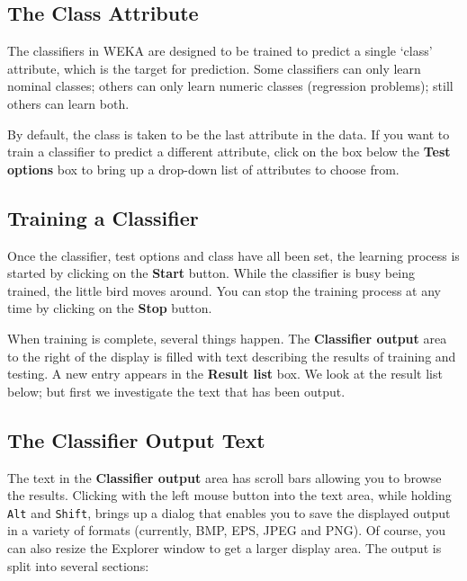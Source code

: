 \subsection{The Class Attribute}

The classifiers in WEKA are designed to be trained to predict a single `class'
attribute, which is the target for prediction. Some classifiers can only learn
nominal classes; others can only learn numeric classes (regression problems);
still others can learn both.

By default, the class is taken to be the last attribute in the data.  If you
want to train a classifier to predict a different attribute, click on the box
below the \textbf{Test options} box to bring up a drop-down list of attributes
to choose from.

\subsection{Training a Classifier}

Once the classifier, test options and class have all been set, the learning
process is started by clicking on the \textbf{Start} button. While the
classifier is busy being trained, the little bird moves around. You can stop
the training process at any time by clicking on the \textbf{Stop} button.

When training is complete, several things happen. The \textbf{Classifier
output} area to the right of the display is filled with text describing the
results of training and testing. A new entry appears in the \textbf{Result
list} box. We look at the result list below; but first we investigate the text
that has been output.

\subsection{The Classifier Output Text}

The text in the \textbf{Classifier output} area has scroll bars allowing you to
browse the results. Clicking with the left mouse button into the text area, 
while holding \texttt{Alt} and \texttt{Shift}, brings up a dialog that enables 
you to save the displayed output in a variety of formats (currently, BMP, EPS, JPEG and PNG). 
Of course, you can also resize the Explorer window to get a larger display area.  
The output is split into several sections:


